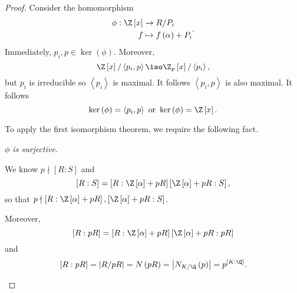 \documentclass[pmath441]{subfiles}
\begin{document}
    \begin{proof}
        Consider the homomorphism
        \begin{equation*}
            \begin{aligned}
                \phi:\Z\left[ x \right] &\to R /P_i \\
                f & \mapsto f\left( \alpha \right) + P_i
            \end{aligned} .
        \end{equation*}
        Immediately, $p_i,p\in\ker\left( \phi \right)$. Moreover,
        \begin{equation*}
            \Z\left[ x \right] /\left< p_i,p \right> \iso \Z_p\left[ x \right] / \left< p_i \right>,  
        \end{equation*}
        but $p_i$ is irreducible so $\left< p_i \right>$ is maximal. It follows $\left< p_i,p \right>$ is also maximal. It follows
        \begin{equation}
            \ker\left( \phi \right) = \left< p_i,p \right> \text{ or } \ker\left( \phi \right) = \Z\left[ x \right].
        \end{equation}

        To apply the first isomorphism theorem, we require the following fact.

        \begin{claim}
            \textit{$\phi$ is surjective.}

            We know $p\nmid\left[ R:S \right]$ and
            \begin{equation*}
                \left[ R:S \right] = \left[ R:\Z\left[ \alpha \right]+pR \right]\left[ \Z\left[ \alpha \right]+pR:S \right],
            \end{equation*}
            so that $p\nmid\left[ R:\Z\left[ \alpha \right]+pR \right],\left[ \Z\left[ \alpha \right]+pR:S \right]$.

            Moreover,
            \begin{equation*}
                \left[ R:pR \right] = \left[ R:\Z\left[ \alpha \right]+pR \right]\left[ \Z\left[ \alpha \right]+pR:pR \right] 
            \end{equation*}
            and
            \begin{equation*}
                \left[ R:pR \right] = \left| R /pR \right| = N\left( pR \right) = \left| N_{K /\Q}\left( p \right) \right| = p^{\left[ K:\Q \right]}.
            \end{equation*}


\end{claim}
\end{proof}
\end{document}
